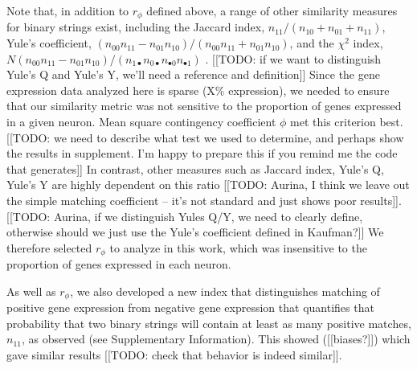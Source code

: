 \documentclass[10pt,letterpaper]{article}
\begin{document}
Note that, in addition to $r_\phi$ defined above, a range of other similarity measures for binary strings exist, including the
Jaccard index, $n_{11}/(n_{10}+n_{01}+n_{11})$,
Yule's coefficient, $(n_{00}n_{11} - n_{01}n_{10})/(n_{00}n_{11} + n_{01}n_{10})$,
and the $\chi^2$ index, $N (n_{00}n_{11} - n_{01}n_{10})/(n_{1\bullet}n_{0\bullet}n_{\bullet 0}n_{\bullet 1})$ \cite{Kaufman2006}.
[[TODO: if we want to distinguish Yule's Q and Yule's Y, we'll need a reference and definition]]
Since the gene expression data analyzed here is sparse (X\% expression), we needed to ensure that our similarity metric was not sensitive to the proportion of genes expressed in a given neuron.
Mean square contingency coefficient $\phi$ met this criterion best.
[[TODO: we need to describe what test we used to determine, and perhaps show the results in supplement. I'm happy to prepare this if you remind me the code that generates]]
In contrast, other measures such as Jaccard index, Yule's Q, Yule's Y are highly dependent on this ratio [[TODO: Aurina, I think we leave out the simple matching coefficient -- it's not standard and just shows poor results]].
[[TODO: Aurina, if we distinguish Yules Q/Y, we need to clearly define, otherwise should we just use the Yule's coefficient defined in Kaufman?]]
We therefore selected $r_\phi$ to analyze in this work, which was insensitive to the proportion of genes expressed in each neuron.

As well as $r_\phi$, we also developed a new index that distinguishes matching of positive gene expression from negative gene expression that quantifies that probability that two binary strings will contain at least as many positive matches, $n_{11}$, as observed (see Supplementary Information).
This showed ([[biases?]]) which gave similar results [[TODO: check that behavior is indeed similar]].
\end{document}
